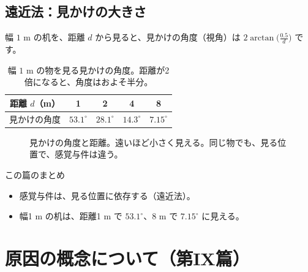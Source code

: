 \documentclass[a4paper,11pt,openany]{ltjsbook}
\begin{document}
\section{遠近法：見かけの大きさ}

幅 $1$ m の机を、距離 $d$ から見ると、見かけの角度（視角）は $2\arctan\bigl(\tfrac{0.5}{d}\bigr)$ です。

\begin{table}[htbp]
\centering
\begin{tabular}{c|cccc}
\toprule
距離 $d$（m） & 1 & 2 & 4 & 8\\
\midrule
見かけの角度 & $53.1^\circ$ & $28.1^\circ$ & $14.3^\circ$ & $7.15^\circ$\\
\bottomrule
\end{tabular}
\caption{幅 $1$ m の物を見る見かけの角度。距離が2倍になると、角度はおよそ半分。}
\end{table}

\begin{figure}[htbp]
\centering
{}
\caption{見かけの角度と距離。遠いほど小さく見える。同じ物でも、見る位置で、感覚与件は違う。}
\end{figure}

\begin{pointbox}{この篇のまとめ}
\begin{itemize}[leftmargin=*]
\item 感覚与件は、見る位置に依存する（遠近法）。
\item 幅1 m の机は、距離1 m で $53.1^\circ$、8 m で $7.15^\circ$ に見える。
\end{itemize}
\end{pointbox}

\chapter{原因の概念について（第IX篇）}
\end{document}
